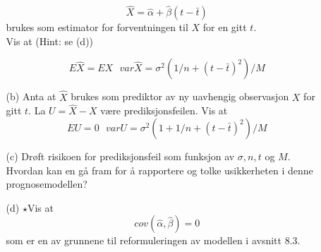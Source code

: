 \begin{enumerate}
\begin{itemize}
               \[\hat X=\hat\alpha +\hat\beta(t-\bar t)\]
          brukes som estimator for forventningen til $X$ for en gitt $t$.\\
         Vis at (Hint: se (d))
          
          \[E\hat X =EX \mbox{\ \ \ \ \ } var\hat{X}=\sigma ^2(1/n+(t-
               \bar t)^2)/M\]
  \item[(b)]  Anta at $\hat X$ brukes som prediktor av ny
               uavhengig observasjon $X$ for gitt $t$. La $U=\hat
               X -X$ være prediksjonsfeilen.
          Vis at
 \[EU=0 \mbox{\ \ \ \ \ } varU=\sigma ^2(1+1/n+(t-\bar t)^2)/M\]
  \item[(c)]  Drøft risikoen for prediksjonsfeil som funksjon
               av $\sigma,n,t$ og $M$. Hvordan kan en gå fram
               for å rapportere og tolke usikkerheten i denne
               prognosemodellen?
  \item[(d)] $\star$Vis at 
   \[ cov(\hat\alpha,\hat\beta)=0 \]
      som er en av grunnene til reformuleringen av modellen i avsnitt 8.3.
 \end{itemize}
\end{enumerate}
\normalsize

